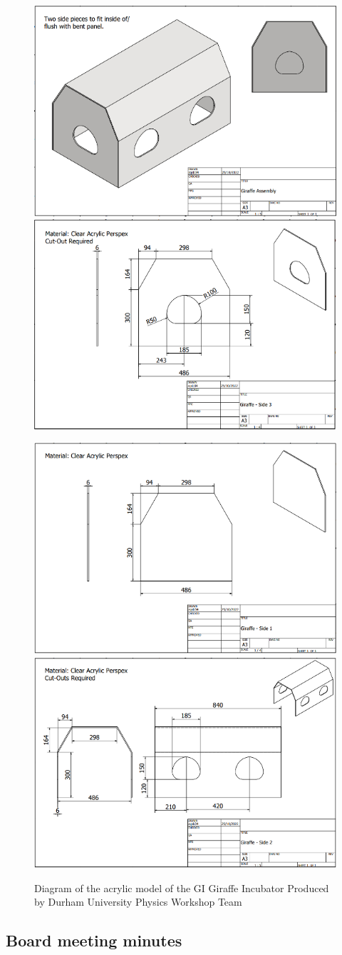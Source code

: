 \documentclass{article}
\begin{document}
\begin{figure}[h]
\centering
\includegraphics[width=.4\textwidth]{Model 1.png}\quad
\includegraphics[width=.4\textwidth]{Model 2.png}

\medskip

\includegraphics[width=.4\textwidth]{Model 3.png}\quad
\includegraphics[width=.4\textwidth]{Model 4.png}
\captionsetup{justification=centering,margin=0.3cm}
\caption{Diagram of the acrylic model of the GI Giraffe Incubator Produced by Durham University Physics Workshop Team} 
\label{Acrylic model}
\end{figure}

\subsection{Board meeting minutes}



\newpage
\thispagestyle{empty}
\mbox{}
\newpage
\newpage
\thispagestyle{empty}
\mbox{}
\newpage
\newpage
\thispagestyle{empty}
\mbox{}
\newpage
\newpage
\thispagestyle{empty}
\mbox{}
\newpage
\newpage
\thispagestyle{empty}
\mbox{}
\newpage
\newpage
\thispagestyle{empty}
\mbox{}
\newpage
\newpage
\thispagestyle{empty}
\mbox{}
\newpage
\newpage
\thispagestyle{empty}
\mbox{}
\newpage
\thispagestyle{empty}
\mbox{}
\newpage
\newpage
\end{document}
